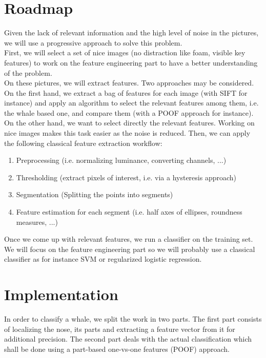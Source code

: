 \documentclass[11pt,a4paper,oneside]{report}
\begin{document}
\section*{Roadmap}
Given the lack of relevant information and the high level of noise in the pictures, we will use a progressive approach to solve this problem. \\
First, we will select a set of nice images (no distraction like foam, visible key features) to work on the feature engineering part to have a better understanding of the problem.\\
On these pictures, we will extract features. Two approaches may be considered. On the first hand, we extract a bag of features for each image (with SIFT for instance) and apply an algorithm to select the relevant features among them, i.e. the whale based one, and compare them (with a POOF approach for instance). On the other hand, we want to select directly the relevant features. Working on nice images makes this task easier as the noise is reduced. Then, we can apply the following classical feature extraction workflow:
\begin{enumerate}
	\item Preprocessing (i.e. normalizing luminance, converting channels, ...)
	\item Thresholding (extract pixels of interest, i.e. via a hysteresis approach)
   	\item Segmentation (Splitting the points into segments)
    	\item Feature estimation for each segment (i.e. half axes of ellipses, roundness measures, ...)
\end{enumerate}
Once we come up with relevant features, we run a classifier on the training set. We will focus on the feature engineering part so we will probably use a classical classifier as for instance SVM or regularized logistic regression. 


\section*{Implementation}
In order to classify a whale, we split the work in two parts. The first part consists of localizing the nose, its parts and extracting a feature vector from it for additional precision. The second part deals with the actual classification which shall be done using a part-based one-vs-one features (POOF) approach. 
\end{document}
